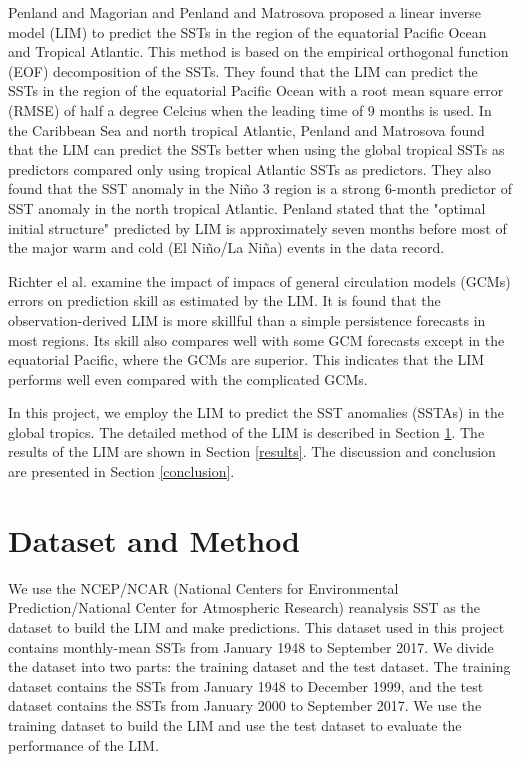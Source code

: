 \documentclass[12pt,a4paper]{article}
\begin{document}
Penland and Magorian \cite{Penland1993} and Penland and Matrosova \cite{Penland1998} proposed a linear inverse model (LIM) to predict the SSTs in the region of the equatorial Pacific Ocean and Tropical Atlantic. This method is based on the empirical orthogonal function (EOF) decomposition of the SSTs. They found that the LIM can predict the SSTs in the region of the equatorial Pacific Ocean with a root mean square error (RMSE) of half a degree Celcius when the leading time of 9 months is used. In the Caribbean Sea and north tropical Atlantic, Penland and Matrosova \cite{Penland1998} found that the LIM can predict the SSTs better when using the global tropical SSTs as predictors compared only using tropical Atlantic SSTs as predictors. They also found that the SST anomaly in the Ni\~no 3 region is a strong 6-month predictor of SST anomaly in the north tropical Atlantic. Penland \cite{Penland1996} stated that the "optimal initial structure" predicted by LIM is approximately seven months before most of the major warm and cold (El Ni\~no/La Ni\~na) events in the data record.

Richter el al. \cite{Richter2020} examine the impact of impacs of general circulation models (GCMs) errors on prediction skill as estimated by the LIM. It is found that the observation-derived LIM is more skillful than a simple persistence forecasts in most regions. Its skill also compares well with some GCM forecasts except in the equatorial Pacific, where the GCMs are superior. This indicates that the LIM performs well even compared with the complicated GCMs.

In this project, we employ the LIM to predict the SST anomalies (SSTAs) in the global tropics. The detailed method of the LIM is described in Section \ref{dataset-method}. The results of the LIM are shown in Section \ref{results}. The discussion and conclusion are presented in Section \ref{conclusion}.

\section{Dataset and Method}\label{dataset-method}

We use the NCEP/NCAR (National Centers for Environmental Prediction/National Center for Atmospheric Research) reanalysis SST as the dataset to build the LIM and make predictions. This dataset used in this project contains monthly-mean SSTs from January 1948 to September 2017. We divide the dataset into two parts: the training dataset and the test dataset. The training dataset contains the SSTs from January 1948 to December 1999, and the test dataset contains the SSTs from January 2000 to September 2017. We use the training dataset to build the LIM and use the test dataset to evaluate the performance of the LIM.
\end{document}
